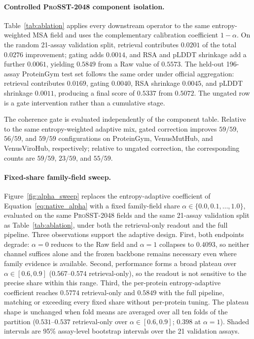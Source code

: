 \documentclass{article} %
\begin{document}
\paragraph{Controlled \textsc{ProSST-2048} component isolation.}
Table~\ref{tab:ablation} applies every downstream operator to the same entropy-weighted MSA field and uses the complementary calibration coefficient $1-\alpha$. On the random 21-assay validation split, retrieval contributes $0.0201$ of the total $0.0276$ improvement; gating adds $0.0014$, and RSA and pLDDT shrinkage add a further $0.0061$, yielding $0.5849$ from a Raw value of $0.5573$. The held-out 196-assay ProteinGym test set follows the same order under official aggregation: retrieval contributes $0.0169$, gating $0.0040$, RSA shrinkage $0.0045$, and pLDDT shrinkage $0.0011$, producing a final score of $0.5337$ from $0.5072$. The ungated row is a gate intervention rather than a cumulative stage.

The coherence gate is evaluated independently of the component table. Relative to the same entropy-weighted adaptive mix, gated correction improves $59/59$, $56/59$, and $59/59$ configurations on ProteinGym, VenusMutHub, and VenusViroHub, respectively; relative to ungated correction, the corresponding counts are $59/59$, $23/59$, and $55/59$.

\paragraph{Fixed-share family-field sweep.}
\label{app:alpha_sweep}
Figure~\ref{fig:alpha_sweep} replaces the entropy-adaptive coefficient of Equation~\ref{eq:native_alpha} with a fixed family-field share $\alpha\in\{0.0,0.1,\dots,1.0\}$, evaluated on the same \textsc{ProSST}-2048 fields and the same 21-assay validation split as Table~\ref{tab:ablation}, under both the retrieval-only readout and the full pipeline. Three observations support the adaptive design. First, both endpoints degrade: $\alpha{=}0$ reduces to the Raw field and $\alpha{=}1$ collapses to $0.4093$, so neither channel suffices alone and the frozen backbone remains necessary even where family evidence is available. Second, performance forms a broad plateau over $\alpha\in[0.6,0.9]$ ($0.567$--$0.574$ retrieval-only), so the readout is not sensitive to the precise share within this range. Third, the per-protein entropy-adaptive coefficient reaches $0.5774$ retrieval-only and $0.5849$ with the full pipeline, matching or exceeding every fixed share without per-protein tuning. The plateau shape is unchanged when fold means are averaged over all ten folds of the partition ($0.531$--$0.537$ retrieval-only over $\alpha\in[0.6,0.9]$; $0.398$ at $\alpha{=}1$). Shaded intervals are 95\% assay-level bootstrap intervals over the 21 validation assays.
\end{document}
